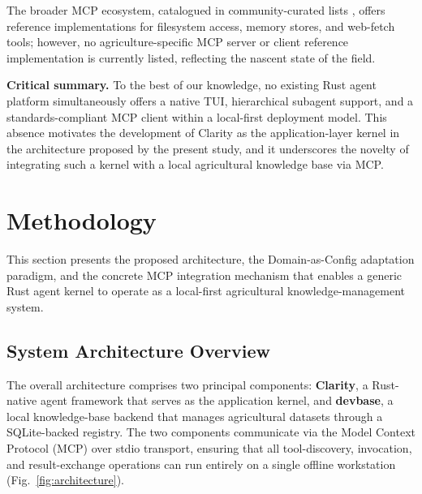 \documentclass[11pt,a4paper]{article}
\begin{document}
The broader MCP ecosystem, catalogued in community-curated lists \cite{awesomemcp2025}, offers reference implementations for filesystem access, memory stores, and web-fetch tools; however, no agriculture-specific MCP server or client reference implementation is currently listed, reflecting the nascent state of the field.

\textbf{Critical summary.} To the best of our knowledge, no existing Rust agent platform simultaneously offers a native TUI, hierarchical subagent support, and a standards-compliant MCP client within a local-first deployment model. This absence motivates the development of Clarity as the application-layer kernel in the architecture proposed by the present study, and it underscores the novelty of integrating such a kernel with a local agricultural knowledge base via MCP.

\section{Methodology}
\label{sec:methodology}

This section presents the proposed architecture, the Domain-as-Config adaptation paradigm, and the concrete MCP integration mechanism that enables a generic Rust agent kernel to operate as a local-first agricultural knowledge-management system.

\subsection{System Architecture Overview}

The overall architecture comprises two principal components: \textbf{Clarity}, a Rust-native agent framework that serves as the application kernel, and \textbf{devbase}, a local knowledge-base backend that manages agricultural datasets through a SQLite-backed registry. The two components communicate via the Model Context Protocol (MCP) over stdio transport, ensuring that all tool-discovery, invocation, and result-exchange operations can run entirely on a single offline workstation (Fig.~\ref{fig:architecture}).
\end{document}
